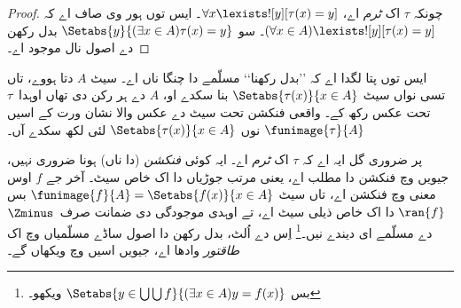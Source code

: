 \documentclass[../../../include/open-logic-section]{subfiles}
\begin{document}
\begin{proof}
چونکہ $\tau$ اک \emph{ٹرم} اے، $\forall x \lexists![y][\tau(x) = y]$۔
ایس توں ہور وی صاف اے کہ $(\forall x \in A)\lexists![y][\tau(x) = y]$۔
سو $\Setabs{y}{(\exists x \in A)\tau(x) = y}$ بدل رکھن دے اصول نال موجود اے۔
\end{proof}
\noindent
ایس توں پتا لگدا اے کہ ’’بدل رکھنا‘‘ مسلّمے دا چنگا ناں اے۔ سیٹ $A$
دتا ہووے، تاں تسی نواں سیٹ $\Setabs{\tau(x)}{x \in A}$ بنا سکدے او،
$A$ دے ہر رکن دی تھاں اوہدا~$\tau$ تحت عکس رکھ کے۔ واقعی فنکشن تحت
سیٹ دے عکس والا نشان ورت کے اسیں $\funimage{\tau}{A}$ نوں
$\Setabs{\tau(x)}{x \in A}$ لئی لکھ سکدے آں۔

پر ضروری گل ایہ اے کہ $\tau$ اک \emph{ٹرم} اے۔ ایہ کوئی \emph{فنکشن}
(دا ناں) ہونا ضروری نہیں، جیویں  وچ فنکشن
دا مطلب اے، یعنی مرتب جوڑیاں دا اک خاص سیٹ۔ آخر جے $f$ اوس معنی وچ
فنکشن اے، تاں سیٹ $\funimage{f}{A} = \Setabs{f(x)}{x \in A}$
بس $\ran{f}$ دا اک خاص ذیلی سیٹ اے، تے اوہدی موجودگی دی ضمانت
صرف~$\Zminus$ دے مسلّمے ای دیندے نیں۔\footnote{بس
$\Setabs{y \in \bigcup \bigcup f}{(\exists x \in A)y = f(x)}$ ویکھو۔}
اِس دے اُلٹ، بدل رکھن دا اصول ساڈے مسلّمیاں وچ اک \emph{طاقتور} وادھا اے،
جیویں اسیں  وچ ویکھاں گے۔
\end{document}
